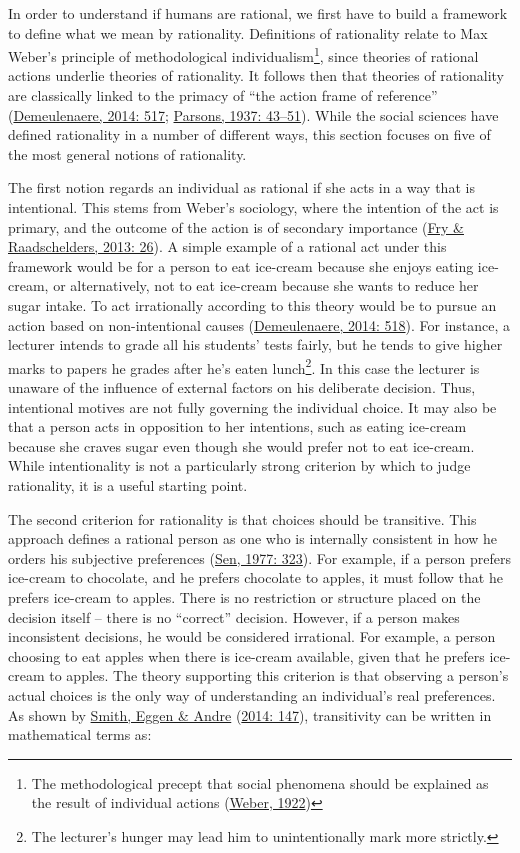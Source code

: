 \documentclass[11pt,preprint, authoryear]{elsarticle}
\numberwithin{equation}{section}
\numberwithin{figure}{section}
\numberwithin{table}{section}
\let\rmarkdownfootnote\footnote%
\def\footnote{\protect\rmarkdownfootnote}
\begin{document}
In order to understand if humans are rational, we first have to build a
framework to define what we mean by rationality. Definitions of
rationality relate to Max Weber's principle of methodological
individualism\footnote{The methodological precept that social phenomena
  should be explained as the result of individual actions
  (\protect\hyperlink{ref-weber}{Weber, 1922})}, since theories of
rational actions underlie theories of rationality. It follows then that
theories of rationality are classically linked to the primacy of ``the
action frame of reference'' (\protect\hyperlink{ref-types}{Demeulenaere,
2014: 517}; \protect\hyperlink{ref-parsons}{Parsons, 1937: 43--51}).
While the social sciences have defined rationality in a number of
different ways, this section focuses on five of the most general notions
of rationality.

The first notion regards an individual as rational if she acts in a way
that is intentional. This stems from Weber's sociology, where the
intention of the act is primary, and the outcome of the action is of
secondary importance (\protect\hyperlink{ref-fry}{Fry \& Raadschelders,
2013: 26}). A simple example of a rational act under this framework
would be for a person to eat ice-cream because she enjoys eating
ice-cream, or alternatively, not to eat ice-cream because she wants to
reduce her sugar intake. To act irrationally according to this theory
would be to pursue an action based on non-intentional causes
(\protect\hyperlink{ref-types}{Demeulenaere, 2014: 518}). For instance,
a lecturer intends to grade all his students' tests fairly, but he tends
to give higher marks to papers he grades after he's eaten
lunch\footnote{The lecturer's hunger may lead him to unintentionally
  mark more strictly.}. In this case the lecturer is unaware of the
influence of external factors on his deliberate decision. Thus,
intentional motives are not fully governing the individual choice. It
may also be that a person acts in opposition to her intentions, such as
eating ice-cream because she craves sugar even though she would prefer
not to eat ice-cream. While intentionality is not a particularly strong
criterion by which to judge rationality, it is a useful starting point.

The second criterion for rationality is that choices should be
transitive. This approach defines a rational person as one who is
internally consistent in how he orders his subjective preferences
(\protect\hyperlink{ref-sen}{Sen, 1977: 323}). For example, if a person
prefers ice-cream to chocolate, and he prefers chocolate to apples, it
must follow that he prefers ice-cream to apples. There is no restriction
or structure placed on the decision itself -- there is no ``correct''
decision. However, if a person makes inconsistent decisions, he would be
considered irrational. For example, a person choosing to eat apples when
there is ice-cream available, given that he prefers ice-cream to apples.
The theory supporting this criterion is that observing a person's actual
choices is the only way of understanding an individual's real
preferences. As shown by \protect\hyperlink{ref-math}{Smith, Eggen \&
Andre} (\protect\hyperlink{ref-math}{2014: 147}), transitivity can be
written in mathematical terms as:
\end{document}
